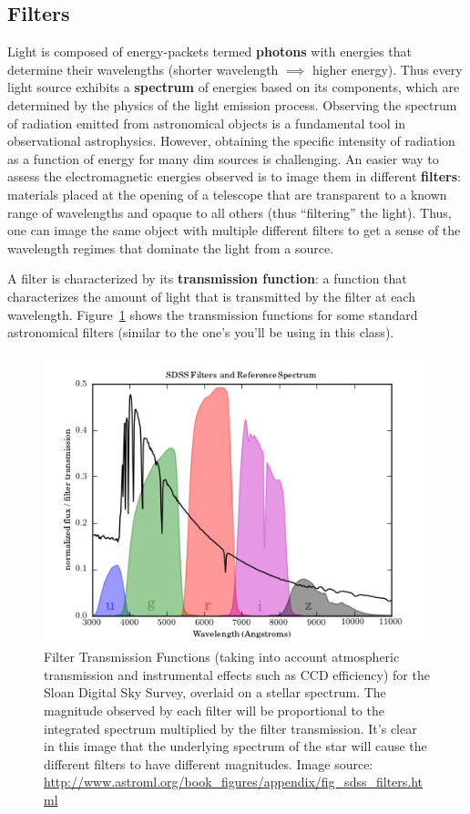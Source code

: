 \subsection{Filters}
Light is composed of energy-packets termed \textbf{photons} with energies that determine their wavelengths (shorter wavelength $\implies$ higher energy). Thus every light source exhibits a \textbf{spectrum} of energies based on its components, which are determined by the physics of the light emission process. Observing the spectrum of radiation emitted from astronomical objects is a fundamental tool in observational astrophysics. However, obtaining the specific intensity of radiation as a function of energy for many dim sources is challenging. An easier way to assess the electromagnetic energies observed is to image them in different \textbf{filters}: materials placed at the opening of a telescope that are transparent to a known range of wavelengths and opaque to all others (thus ``filtering'' the light). Thus, one can image the same object with multiple different filters to get a sense of the wavelength regimes that dominate the light from a source.

A filter is characterized by its \textbf{transmission function}: a function that characterizes the amount of light that is transmitted by the filter at each wavelength. Figure~\ref{sdss_filters} shows the transmission functions for some standard astronomical filters (similar to the one's you'll be using in this class).

\begin{figure}
\label{sdss_filters}
\includegraphics{hr_diagram/fig_sdss_filters_1.png}
\caption{Filter Transmission Functions (taking into account atmospheric transmission and instrumental effects such as CCD efficiency) for the Sloan Digital Sky Survey, overlaid on a stellar spectrum. The magnitude observed by each filter will be proportional to the integrated spectrum multiplied by the filter transmission. It's clear in this image that the underlying spectrum of the star will cause the different filters to have different magnitudes. Image source: \url{http://www.astroml.org/book\_figures/appendix/fig\_sdss\_filters.html}}
\end{figure}

